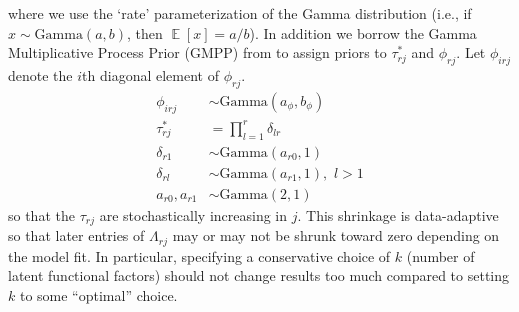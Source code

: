 \documentclass[useAMS,referee,usenatbib]{biom}
\DeclareMathOperator{\E}{\mathbb{E}}
\begin{document}
where we use the `rate' parameterization of the Gamma distribution (i.e., if $x \sim \text{Gamma}(a, b)$, then $\E[x] = a/b$). In addition we borrow the Gamma Multiplicative Process Prior (GMPP) from \cite{Bhattacharya2011, Montagna2012} to assign priors to $\tau^{*}_{rj}$ and $\phi_{rj}$. Let $\phi_{irj}$ denote the $i$th diagonal element of $\phi_{rj}$.
\begin{align}
\label{eq:phi}\phi_{irj}&\sim \text{Gamma}(a_{\phi}, b_{\phi})\\
\label{eq:shrink1}\tau^{*}_{rj} &= \prod_{l=1}^{r}\delta_{lr}\\
\label{eq:shrink2}\delta_{r1} &\sim \text{Gamma}(a_{r0}, 1)\\
\label{eq:shrink3}\delta_{rl} &\sim \text{Gamma}(a_{r1}, 1),\,\, l > 1\\
\label{eq:shrink4}a_{r0}, a_{r1} &\sim \text{Gamma}(2,1)
\end{align}
so that the $\tau_{rj}$ are stochastically increasing in $j$. This shrinkage is data-adaptive so that later entries of $\Lambda_{rj}$ may or may not be shrunk toward zero depending on the model fit. In particular, specifying a conservative choice of $k$ (number of latent functional factors) should not change results too much compared to setting $k$ to some ``optimal'' choice. 
\end{document}
